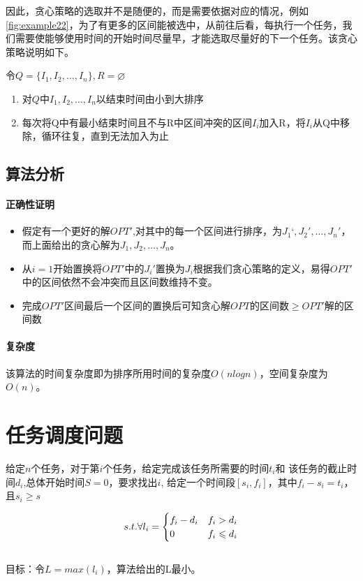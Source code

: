 \newpage
因此，贪心策略的选取并不是随便的，而是需要依据对应的情况，例如\autoref{fig:example22}，为了有更多的区间能被选中，从前往后看，每执行一个任务，我们需要使能够使用时间的开始时间尽量早，才能选取尽量好的下一个任务。该贪心策略说明如下。

令$Q=\{I_1, I_2, \ldots, I_n\},R=\varnothing$

\begin{enumerate}
    \item 对$Q$中$I_1, I_2, \ldots, I_n$以结束时间由小到大排序
    \item 每次将Q中有最小结束时间且不与R中区间冲突的区间$I_i$加入R，将$I_i$从Q中移除，循环往复，直到无法加入为止
\end{enumerate}

\subsection{算法分析}
\paragraph*{正确性证明}
\begin{itemize}
    \item 假定有一个更好的解$OPT'$,对其中的每一个区间进行排序，为$J_1‘,J_2',\ldots,J_n'$，而上面给出的贪心解为$J_1,J_2,\ldots,J_n$。
    \item 从$i=1$开始置换将$OPT'$中的$J_i'置换为J_i$根据我们贪心策略的定义，易得$OPT'$中的区间依然不会冲突而且区间数维持不变。
    \item 完成$OPT'$区间最后一个区间的置换后可知贪心解$OPT$的区间数$\geq OPT'$解的区间数
\end{itemize}

\paragraph*{复杂度}
该算法的时间复杂度即为排序所用时间的复杂度$O(nlogn)$，空间复杂度为$O(n)$。

\section{任务调度问题}
\begin{example}
	给定$n$个任务，对于第$i$个任务，给定完成该任务所需要的时间$t_i$和
	该任务的截止时间$d_i$,总体开始时间$S=0$，要求找出$i$,
	给定一个时间段$[s_i,f_i]$，其中$f_i - s_i = t_i$，且$s_i\geqslant s$

	\begin{equation}
		s.t. \forall \space l_i = \begin{cases}
			f_i - d_i & f_i > d_i    \\
			0        & f_i \leqslant d_i
		\end{cases}
	\end{equation}
	\\目标：令$L=max(l_i)$，算法给出的L最小。
\end{example}

